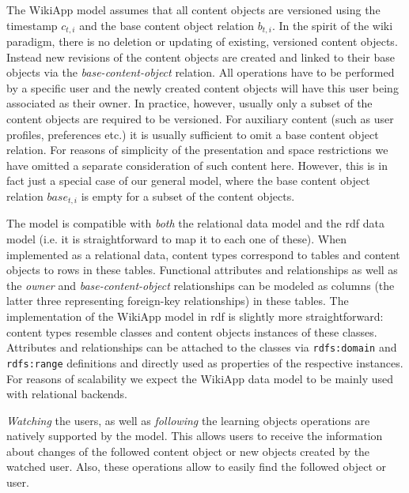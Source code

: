 \documentclass[PhD, Submit, ngerman,UKenglish,table]{scrbook}
\begin{document}
The WikiApp model assumes that all content objects are versioned using the timestamp $c_{t,i}$ and the base content object relation $b_{t,i}$.
In the spirit of the wiki paradigm, there is no deletion or updating of existing, versioned content objects.
Instead new revisions of the content objects are created and linked to their base objects via the \textit{base-content-object} relation.
All operations have to be performed by a specific user and the newly created content objects will have this user being associated as their owner.
In practice, however, usually only a subset of the content objects are required to be versioned.
For auxiliary content (such as user profiles, preferences etc.) it is usually sufficient to omit a base content object relation.
For reasons of simplicity of the presentation and space restrictions we have omitted a separate consideration of such content here.
However, this is in fact just a special case of our general model, where the base content object relation $base_{t,i}$ is empty for a subset of the content objects.

The model is compatible with \emph{both} the relational data model and the \gls{rdf} data model (i.e. it is straightforward to map it to each one of these).
When implemented as a relational data, content types correspond to tables and content objects to rows in these tables.
Functional attributes and relationships as well as the \textit{owner} and \textit{base-content-object} relationships can be modeled as columns (the latter three representing foreign-key relationships) in these tables.
The implementation of the WikiApp model in \gls{rdf} is slightly more straightforward: content types resemble classes and content objects instances of these classes.
Attributes and relationships can be attached to the classes via \verb|rdfs:domain| and \verb|rdfs:range| definitions and directly used as properties of the respective instances.
For reasons of scalability we expect the WikiApp data model to be mainly used with relational backends.

\textit{Watching} the users, as well as \textit{following} the learning objects operations are natively supported by the model.
This allows users to receive the information about changes of the followed content object or new objects created by the watched user.
Also, these operations allow to easily find the followed object or user.
\end{document}
